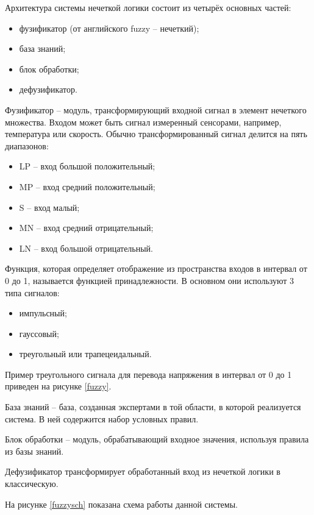 Архитектура системы нечеткой логики состоит из четырёх основных частей:
\begin{itemize}
	\item фузификатор (от английского fuzzy -- нечеткий); 
	\item база знаний;
	\item блок обработки; 
	\item дефузификатор.
\end{itemize}

Фузификатор -- модуль, трансформирующий входной сигнал в элемент нечеткого множества. 
Входом может быть сигнал измеренный сенсорами, например, температура или скорость. 
Обычно трансформированный сигнал делится на пять диапазонов:
\begin{itemize}
	\item LP -- вход большой положительный;
	\item MP -- вход средний положительный;
	\item S -- вход малый;
	\item MN -- вход средний отрицательный;
	\item LN -- вход большой отрицательный.
\end{itemize}

Функция, которая  определяет отображение из пространства входов в интервал от 0 до 1, называется функцией принадлежности. 
В основном они используют 3 типа сигналов:
\begin{itemize}
	\item импульсный;
	\item гауссовый;
	\item треугольный или трапецеидальный.
\end{itemize}

Пример треугольного сигнала для перевода напряжения в интервал от 0 до 1 приведен на рисунке \ref{fuzzy}.

База знаний  -- база, созданная экспертами в той области, в которой реализуется система. 
В ней содержится набор условных правил.

Блок обработки -- модуль, обрабатывающий входное значения, используя правила из базы знаний.

Дефузификатор трансформирует обработанный вход из нечеткой логики в классическую.

На рисунке \ref{fuzzysch} показана схема работы данной системы.

